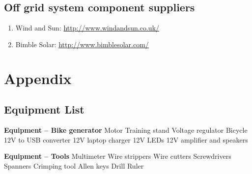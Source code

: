 \documentclass{article}
\theoremstyle{definition}
\theoremstyle{definition}
\theoremstyle{remark}
\begin{document}

  \subsection{Off grid system component suppliers} %
  \label{sub:off_grid_system_component_suppliers}

    \begin{enumerate}[resume]
      \item Wind and Sun: \href{http://www.windandsun.co.uk/}{http://www.windandsun.co.uk/}
      \item Bimble Solar: \href{http://www.bimblesolar.com/}{http://www.bimblesolar.com/}
    \end{enumerate}
  


\newpage

\section{Appendix} %
\label{sec:appendix}

  \subsection{Equipment List} %
  \label{sub:equipment_list}

    \textbf{Equipment – Bike generator}
    Motor \newline
    Training stand \newline
    Voltage regulator \newline
    Bicycle \newline
    12V to USB converter \newline
    12V laptop charger \newline
    12V LEDs \newline
    12V amplifier and speakers

    \textbf{Equipment – Tools} \newline
    Multimeter \newline
    Wire strippers \newline
    Wire cutters \newline
    Screwdrivers \newline
    Spanners \newline
    Crimping tool \newline
    Allen keys \newline
    Drill \newline
    Ruler
\end{document}
